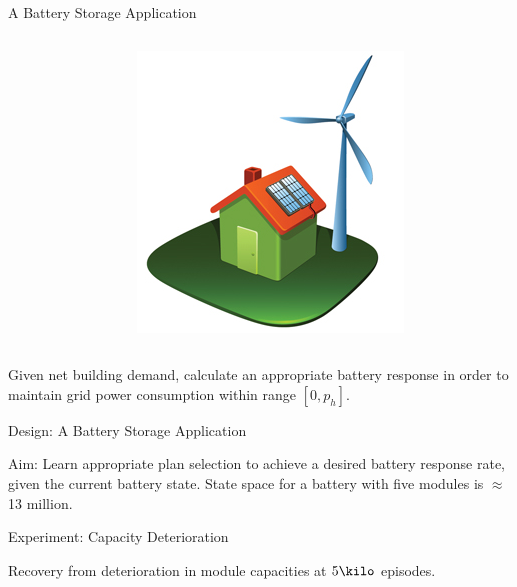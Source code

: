 \documentclass[10pt]{beamer}
\renewcommand\example[1]{{\color{black!50!green}#1}}
\begin{document}
\begin{frame}{A Battery Storage Application}
\begin{columns}
\begin{column}[l]{0.6\textwidth}

\end{column}
\begin{column}[r]{0.3\textwidth}
\begin{center}\includegraphics[scale=0.4]{figs/fig-storage-building}\end{center}
\end{column}
\end{columns}
Given net building demand, \alert{calculate an appropriate battery response} in order to maintain grid power consumption within range $[0,p_h]$.
\end{frame}

\begin{frame}{Design: A Battery Storage Application}
\begin{center}
\resizebox{0.8\textwidth}{!}{

}
\end{center}
Aim: Learn appropriate plan selection to achieve a desired \alert{battery response rate}, given the current battery state. \example{State space for a battery with five modules is $\approx$13 million.}
\end{frame}

\begin{frame}[allowframebreaks]{Experiment: Capacity Deterioration}

\begin{center}
\resizebox{0.7\textwidth}{!}{

}

Recovery from \alert{deterioration in module capacities} at $5\kilo$ episodes.
\end{center}
\end{frame}
\end{document}
